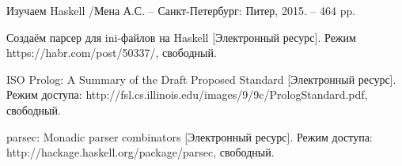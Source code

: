 
\begin{thebibliography}{9}
	 
	  Изучаем Haskell /Мена А.С. -- Санкт-Петербург: Питер, 2015. -- 464 pp.
	 
	  Создаём парсер для ini-файлов на Haskell
	  [Электронный ресурс]. Режим https://habr.com/post/50337/, свободный.
	 
	  ISO Prolog: A Summary of the Draft Proposed Standard [Электронный ресурс]. Режим доступа: http://fsl.cs.illinois.edu/images/9/9c/PrologStandard.pdf, свободный.
	 
	  parsec: Monadic parser combinators [Электронный ресурс]. Режим доступа: http://hackage.haskell.org/package/parsec, свободный.
	 
	 
\end{thebibliography}